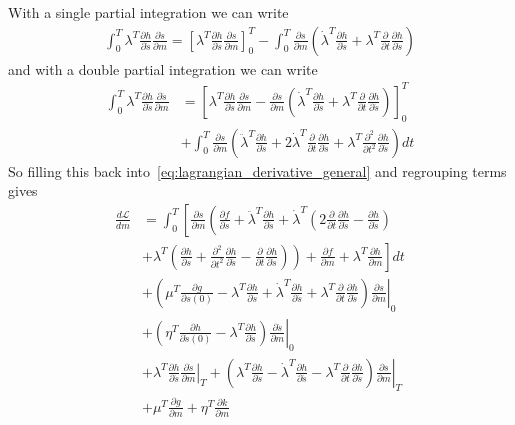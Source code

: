 \documentclass[fleqn,11pt]{SelfArx} %
\newcommand{\pder}[2][]{\frac{\partial#1}{\partial#2}}
\newcommand{\ppder}[2][]{\frac{\partial^2#1}{\partial#2^2}}
\theoremstyle{definition}
\begin{document}
With a single partial integration we can write
\begin{equation}\label{eq:lagrangian_partial_first_order}
\begin{aligned}
\int^T_0  \lambda^T \pder[h]{\dot s} \pder[\dot s]{m} = \left[\lambda^T \pder[h]{\dot s} \pder[s]{m}\right]^T_0
 - \int_0^T \pder[s]{m}\left(\dot \lambda^T \pder[h]{\dot s} + \lambda^T \pder{t}\pder[h]{\dot s} \right)
\end{aligned}
\end{equation}
and with a double partial integration we can write
\begin{equation}\label{eq:lagrangian_partial_second_order}
\begin{aligned}
\int^T_0  \lambda^T \pder[h]{\ddot s} \pder[\ddot s]{m} &= \left[\lambda^T \pder[h]{\dot s} \pder[\dot s]{m} - \pder[s]{m}\left(\dot \lambda^T \pder[h]{\ddot s} + \lambda^T \pder{t}\pder[h]{\ddot s}\right)  \right]^T_0 \\
 &+ \int_0^T \pder[s]{m}\left(\ddot \lambda^T \pder[h]{\ddot s} + 2 \dot \lambda^T \pder{t}\pder[h]{\ddot s} + \lambda^T \ppder{t}\pder[h]{\ddot s} \right) dt 
\end{aligned}
\end{equation}
So filling this back into~\cref{eq:lagrangian_derivative_general} and regrouping terms gives
\begin{equation}
\begin{aligned}
\frac{d\mathcal{L}}{dm}& = \int_0^T \left[\pder[s]{m}\left( \pder[f]{s} + \ddot \lambda^T \pder[h]{\ddot s}
 + \dot \lambda^T\left(2\pder{t}\pder[h]{\ddot s}- \pder[h]{\dot s}\right)\right.\right. \\
& \left. \left.  + \lambda^T\left(\pder[h]{s} + \ppder{t}\pder[h]{\ddot s} -\pder{t}\pder[h]{\dot s}\right)\right)
 + \pder[f]{m} + \lambda^T \pder[h]{m}\right]dt \\
 &+\left.\left(\mu^T \pder[g]{s(0)} - \lambda^T\pder[h]{\dot s} + \dot \lambda^T \pder[h]{\ddot s} + \lambda^T\pder{t}\pder[h]{\ddot s}\right)\pder[s]{m}\right|_0 \\
 &+ \left. \left(\eta^T\pder[h]{\dot s(0)} - \lambda^T \pder[h]{\ddot s}\right)\pder[\dot s]{m}\right|_0 \\
 & + \left.\lambda^T \pder[h]{\ddot s} \pder[\dot s]{m}\right|_T + \left.\left(\lambda^T \pder[h]{\dot s} - \dot \lambda^T \pder[h]{\ddot s} - \lambda^T \pder{t}\pder[h]{\ddot s} \right)\pder[s]{m}\right|_T\\
 & + \mu^T \pder[g]{m} + \eta^T \pder[k]{m}
\end{aligned}
\end{equation}
\end{document}
